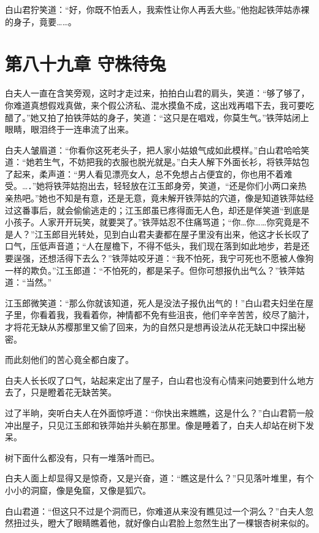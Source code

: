 \documentclass[12pt,oneside]{book}
\begin{document}
白山君狞笑道：``好，你既不怕丢人，我索性让你人再丢大些。''他抱起铁萍姑赤裸的身子，竟要\ldots\ldots。

\hypertarget{ux7b2cux516bux5341ux4e5dux7ae0-ux5b88ux682aux5f85ux5154}{%
\chapter{第八十九章
守株待兔}\label{ux7b2cux516bux5341ux4e5dux7ae0-ux5b88ux682aux5f85ux5154}}

白夫人一直在含笑旁观，这时才走过来，拍拍白山君的肩头，笑道：``够了够了，你难道真想假戏真做，来个假公济私、混水摸鱼不成，这出戏再唱下去，我可要吃醋了。''她又拍了拍铁萍姑的身子，笑道：``这只是在唱戏，你莫生气。''铁萍姑闭上眼睛，眼泪终于一连串流了出来。

白夫人皱眉道：``你看你这死老头子，把人家小姑娘气成如此模样。''白山君哈哈笑道：``她若生气，不妨把我的衣服也脱光就是。''白夫人解下外面长衫，将铁萍姑包了起来，柔声道：``男人看见漂亮女人，总不免想占占便宜的，你也用不着难受。\ldots．''她将铁萍姑抱出去，轻轻放在江玉郎身旁，笑道，``还是你们小两口亲热亲热吧。''她也不知是有意，还是无意，竟未解开铁萍姑的穴道，像是知道铁萍姑经过这番事后，就会偷偷逃走的；江玉郎虽已疼得面无人色，却还是佯笑道``到底是小孩子。人家开开玩笑，就要哭了。''铁萍姑忍不住痛骂道；``你\ldots 你\ldots\ldots 你究竟是不是人？''江玉郎目光转处，见到白山君夫妻都在屋子里没有出来，他这才长长叹了口气，压低声音道；``人在屋檐下，不得不低头，我们现在落到如此地步，若是还要逞强，还想活得下去么？''铁萍姑咬牙道：``我不怕死，我宁可死也不愿被人像狗一样的欺负。''江玉郎道：``不怕死的，都是呆子。但你可想报仇出气么？''铁萍姑道：``当然。''

江玉郎微笑道：``那么你就该知道，死人是没法子报仇出气的！''白山君夫妇坐在屋子里，你看着我，我看着你，神情都不免有些沮丧，他们辛辛苦苦，绞尽了脑汁，才将花无缺从苏樱那里又偷了回来，为的自然只是想再设法从花无缺口中探出秘密。

而此刻他们的苦心竟全都白废了。

白夫人长长叹了口气，站起来定出了屋子，白山君也没有心情来问她要到什么地方去了，只是瞪着花无缺苦笑。

过了半晌，突听白夫人在外面惊呼道：``你快出来瞧瞧，这是什么？''白山君箭一般冲出屋子，只见江玉郎和铁萍始并头躺在那里。像是睡着了，白夫人却站在树下发呆。

树下面什么都没有，只有一堆落叶而已。

白夫人面上却显得又是惊奇，又是兴奋，道：``瞧这是什么？''只见落叶堆里，有个小小的洞窟，像是兔窟，又像是狐穴。

白山君道：``但这只不过是个洞而已，你难道从来没有瞧见过一个洞么？''白夫人忽然扭过头，瞪大了眼睛瞧着他，就好像白山君脸上忽然生出了一棵银杏树来似的。
\end{document}
